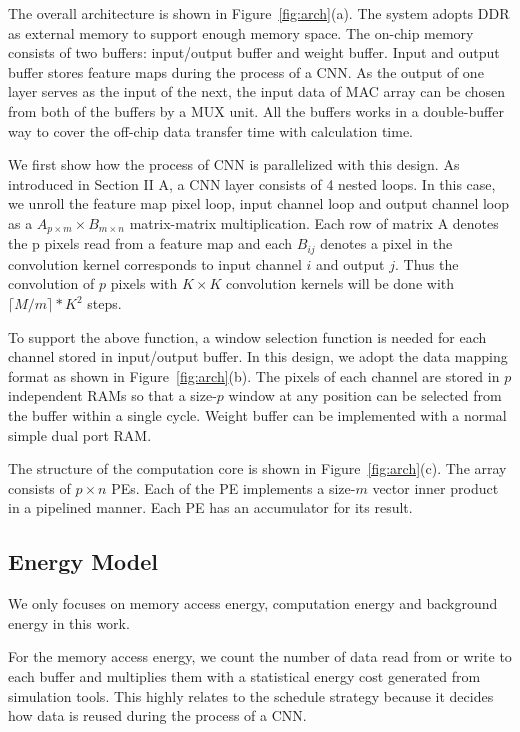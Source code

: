 \documentclass[10pt, conference]{IEEEtran}
\begin{document}
    The overall architecture is shown in Figure~\ref{fig:arch}(a). The system adopts DDR as external memory to support enough memory space. The on-chip memory consists of two buffers: input/output buffer and weight buffer. Input and output buffer stores feature maps during the process of a CNN. As the output of one layer serves as the input of the next, the input data of MAC array can be chosen from both of the buffers by a MUX unit. All the buffers works in a double-buffer way to cover the off-chip data transfer time with calculation time.
    
    We first show how the process of CNN is parallelized with this design. As introduced in Section II A, a CNN layer consists of 4 nested loops. In this case, we unroll the feature map pixel loop, input channel loop and output channel loop as a $A_{p\times m}\times B_{m\times n}$ matrix-matrix multiplication. Each row of matrix A denotes the p pixels read from a feature map and each $B_{ij}$ denotes a pixel in the convolution kernel corresponds to input channel $i$ and output $j$. Thus the convolution of $p$ pixels with $K\times K$ convolution kernels will be done with $\lceil M/m\rceil*K^2$ steps. 
    
    To support the above function, a window selection function is needed for each channel stored in input/output buffer. In this design, we adopt the data mapping format as shown in Figure~\ref{fig:arch}(b). The pixels of each channel are stored in $p$ independent RAMs so that a size-$p$ window at any position can be selected from the buffer within a single cycle. Weight buffer can be implemented with a normal simple dual port RAM.
    
    The structure of the computation core is shown in Figure~\ref{fig:arch}(c). The array consists of $p\times n$ PEs. Each of the PE implements a size-$m$ vector inner product in a pipelined manner. Each PE has an accumulator for its result. 
    
    \subsection{Energy Model}
    We only focuses on memory access energy, computation energy and background energy in this work. 
    
    For the memory access energy, we count the number of data read from or write to each buffer and multiplies them with a statistical energy cost generated from simulation tools. This highly relates to the schedule strategy because it decides how data is reused during the process of a CNN.
    
\end{document}
